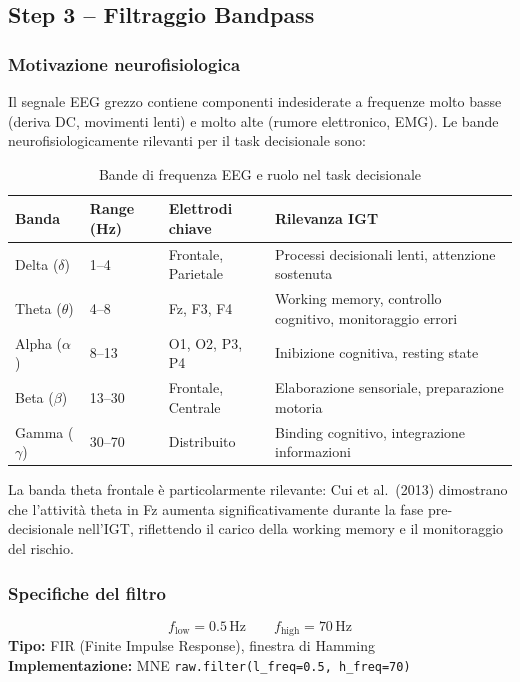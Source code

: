 \documentclass[12pt, a4paper]{article}
\begin{document}
\subsection{Step 3 -- Filtraggio Bandpass}

\subsubsection{Motivazione neurofisiologica}
Il segnale EEG grezzo contiene componenti indesiderate a frequenze molto basse (deriva DC, movimenti lenti) e molto alte (rumore elettronico, EMG). Le bande neurofisiologicamente rilevanti per il task decisionale sono:

\begin{table}[h!]
\centering
\caption{Bande di frequenza EEG e ruolo nel task decisionale}
\begin{tabular}{lllp{5cm}}
\toprule
\textbf{Banda} & \textbf{Range (Hz)} & \textbf{Elettrodi chiave} & \textbf{Rilevanza IGT} \\
\midrule
Delta ($\delta$) & 1--4    & Frontale, Parietale & Processi decisionali lenti, attenzione sostenuta \\
Theta ($\theta$) & 4--8    & Fz, F3, F4          & Working memory, controllo cognitivo, monitoraggio errori \\
Alpha ($\alpha$) & 8--13   & O1, O2, P3, P4      & Inibizione cognitiva, resting state \\
Beta ($\beta$)   & 13--30  & Frontale, Centrale  & Elaborazione sensoriale, preparazione motoria \\
Gamma ($\gamma$) & 30--70  & Distribuito         & Binding cognitivo, integrazione informazioni \\
\bottomrule
\end{tabular}
\end{table}

La banda theta frontale è particolarmente rilevante: Cui et al.\ (2013) dimostrano che l'attività theta in Fz aumenta significativamente durante la fase pre-decisionale nell'IGT, riflettendo il carico della working memory e il monitoraggio del rischio.

\subsubsection{Specifiche del filtro}

\begin{formulabox}
\[
f_\text{low} = 0.5\,\text{Hz} \qquad f_\text{high} = 70\,\text{Hz}
\]
\textbf{Tipo:} FIR (Finite Impulse Response), finestra di Hamming\\
\textbf{Implementazione:} MNE \texttt{raw.filter(l\_freq=0.5, h\_freq=70)}
\end{formulabox}
\end{document}
